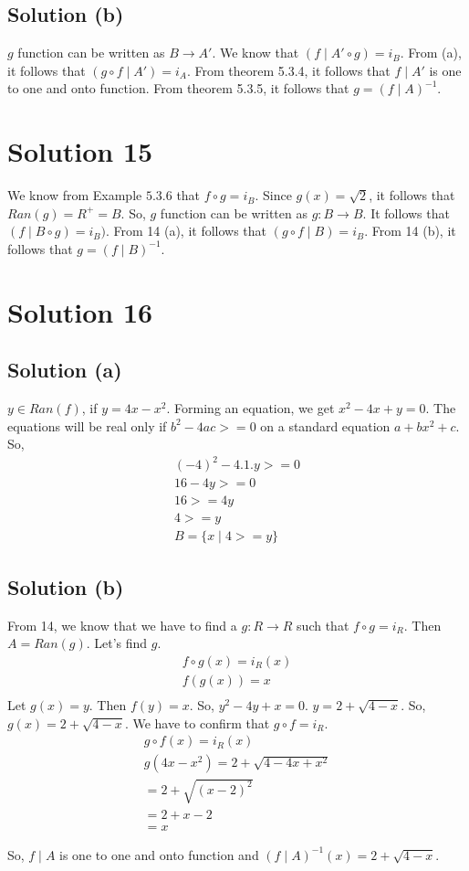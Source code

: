 \documentclass{article}
\begin{document}
\subsection{Solution (b)}
$g$ function can be written as $B \to A'$. We know that $(f \mid A' \circ
g) = i_B$. From (a), it follows that $(g \circ f \mid A') = i_A$. From
theorem 5.3.4, it follows that $f \mid A'$ is one to one and onto
function. From theorem 5.3.5, it follows that $g=(f \mid A)^{-1}$.

\section{Solution 15}
We know from Example $5.3.6$ that $f \circ g = i_B$. Since $g(x)=
\sqrt{2}$, it follows that $Ran(g) = R^{+} = B$. So, $g$ function can
be written as $g: B \to B$. It follows that $(f \mid B \circ g) =
i_B)$. From 14 (a), it follows that $(g \circ f \mid B) = i_B$. From
14 (b), it follows that $g = (f \mid B)^{-1}$.

\section{Solution 16}

\subsection{Solution (a)}
$y \in Ran(f)$, if $y = 4x - x^2$. Forming an equation, we get
$x^2 - 4x + y = 0$. The equations will be real only if
$b^2 - 4ac >= 0$ on a standard equation $a + bx^2 + c$. So,
\begin{align*}
  (-4)^2 - 4.1.y >= 0 \\
  16 - 4y >= 0 \\
  16 >= 4y \\
  4 >= y \\
  B = \{x \mid 4 >= y \}
\end{align*}


\subsection{Solution (b)}
From 14, we know that we have to find a $g: R \to R$ such that $f
\circ g = i_R$. Then $A = Ran(g)$. Let's find $g$.
\begin{align*}
  f \circ g(x) = i_R(x) \\
  f(g(x)) = x \\
\end{align*}
Let $g(x) = y$. Then $f(y) = x$. So, $y^2 - 4y + x = 0$.
$y = 2 + \sqrt{4-x}$. So, $g(x) = 2 + \sqrt{4 - x}$. We have to
confirm that $g \circ f = i_R$.
\begin{align*}
  g \circ f(x) = i_R(x) \\
  g(4x - x^2) = 2 + \sqrt{4 - 4x + x^2} \\
  = 2 + \sqrt{(x - 2)^2} \\
  = 2 + x - 2 \\
  = x
\end{align*}

So, $f \mid A$ is one to one and onto function and $(f \mid A)^{-1}
(x) = 2 + \sqrt{4 - x}$.
\end{document}
